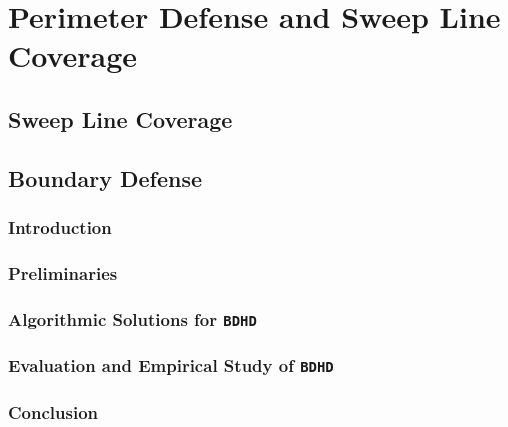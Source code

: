 
\chapter{Perimeter Defense and Sweep Line Coverage}
\thispagestyle{myheadings}
\section{Sweep Line Coverage}







\section{Boundary Defense}
\def\prob{{\texttt{{BDHD}}}\xspace}
\def\ours{{{{EDP}}}\xspace}
\def\oours{{{{OEDP}}}\xspace}
\subsection{Introduction}
\label{sec:bd-intro}
\subsection{Preliminaries}\label{sec:bd-preliminary}

\subsection{Algorithmic Solutions for \prob}\label{sec:bd-algorithm}

\subsection{Evaluation and Empirical Study of \prob}\label{sec:bd-evaluation}

\subsection{Conclusion}\label{sec:bd-conclusion}
